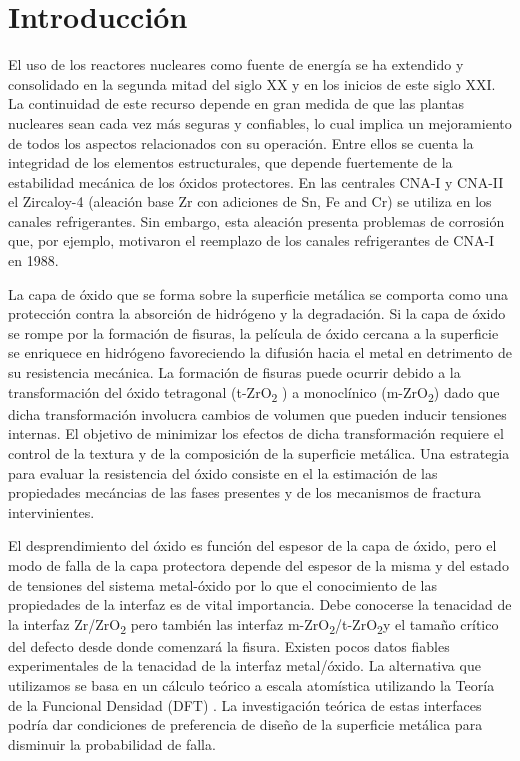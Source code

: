 \section{Introducción }

El uso de los reactores nucleares como fuente de energía se ha extendido y 
consolidado en la segunda mitad del siglo XX y en los inicios de este siglo 
XXI. La continuidad de este recurso depende en gran medida de que las plantas 
nucleares sean cada vez más seguras y confiables, lo cual implica un 
mejoramiento de todos los aspectos relacionados con su operación. Entre ellos 
se cuenta la integridad de los elementos estructurales, que depende fuertemente 
de la estabilidad mecánica de los óxidos protectores. En las centrales CNA-I y 
CNA-II el Zircaloy-4 (aleación base Zr con adiciones de Sn, Fe and Cr) se 
utiliza en los canales refrigerantes\cite{Estevez2000}. Sin embargo, esta 
aleación presenta 
problemas de corrosión que, por ejemplo, motivaron el reemplazo de los canales 
refrigerantes de CNA-I en 1988.

La capa de óxido que se forma sobre la superficie metálica se comporta como una 
protección contra la absorción de hidrógeno y la degradación. Si la capa de 
óxido se rompe por la formación de fisuras, la película de óxido cercana a la 
superficie se enriquece en hidrógeno favoreciendo la difusión hacia el metal en 
detrimento de su resistencia mecánica\cite{Schutze2005}.
La formación de fisuras puede ocurrir 
debido a la transformación del óxido tetragonal (t-ZrO\textsubscript{2} ) 
a monoclínico (m-ZrO\textsubscript{2}) \cite{Li2007, Motta2011}  dado que dicha 
transformación involucra cambios de volumen que pueden inducir tensiones 
internas. El objetivo de minimizar los efectos de dicha transformación requiere 
el control de la textura y de la composición de la superficie metálica. Una 
estrategia para evaluar la resistencia del óxido consiste en 
el la estimación de las propiedades mecáncias de las fases presentes
y de los mecanismos de fractura intervinientes.

El desprendimiento del óxido es función del espesor de la capa de óxido\cite{Schutze2005},
pero el modo de falla de la capa protectora depende del espesor de la misma y del estado de 
tensiones del sistema metal-óxido por lo que el conocimiento de las propiedades 
de la interfaz es de vital importancia. Debe conocerse la tenacidad de la 
interfaz Zr/ZrO\textsubscript{2}  pero también las interfaz
m-ZrO\textsubscript{2}/t-ZrO\textsubscript{2}y el tamaño crítico del defecto desde donde 
comenzará la fisura. Existen pocos datos fiables experimentales de la tenacidad 
de la interfaz metal/óxido. La alternativa que utilizamos se basa en un cálculo 
teórico a escala atomística utilizando la Teoría de la Funcional Densidad (DFT) 
\cite{KohnSham65,HohenbergKohn64}. La 
investigación teórica de estas interfaces podría dar condiciones de preferencia de 
diseño de la superficie metálica para disminuir la probabilidad de falla.

